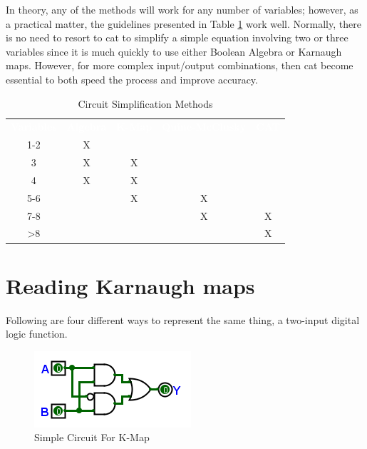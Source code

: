 In theory, any of the methods will work for any number of variables; however, as a practical matter, the guidelines presented in Table \ref{KM:tab:circuit_simplification_methods} work well. Normally, there is no need to resort to \gls{cat} to simplify a simple equation involving two or three variables since it is much quickly to use either Boolean Algebra or Karnaugh maps. However, for more complex input/output combinations, then \gls{cat} become essential to both speed the process and improve accuracy. 

\begin{table}[H]
  \sffamily
  \newcommand{\head}[1]{\textcolor{white}{\textbf{#1}}}    
  \begin{center}
    \begin{tabular}{ccccc} 
      \rowcolor{black!75}
      \head{Variables} & \head{Algebra} & \head{K-Map} & \head{Quine-McClusky} & \head{CAT} \\
      1-2 & X &   &   &   \\
      3   & X & X &   &   \\
      4   & X & X &   &   \\
      5-6 &   & X & X &   \\
      7-8 &   &   & X & X \\
      >8  &   &   &   & X
    \end{tabular}
  \end{center}
  \caption{Circuit Simplification Methods}
  \label{KM:tab:circuit_simplification_methods}
\end{table}

\section{Reading Karnaugh maps}
\label{KM:sec:reading_karnaugh_maps}

Following are four different ways to represent the same thing, a two-input digital logic function. 

\begin{figure}[H]
	\centering
	\includegraphics[width=\maxwidth{.95\linewidth}]{gfx/06_01}
	\caption{Simple Circuit For K-Map}
	\label{fig:06_01}
\end{figure}

